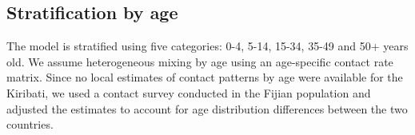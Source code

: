 \subsection{Stratification by age}
The model is stratified using five categories: 0-4, 5-14, 15-34, 35-49 and 50+ years old. We assume 
heterogeneous mixing by age using an age-specific contact rate matrix. Since no local estimates of 
contact patterns by age were available for the Kiribati, we used a contact survey conducted in 
the Fijian population and adjusted the estimates to account for age distribution differences between
the two countries.

